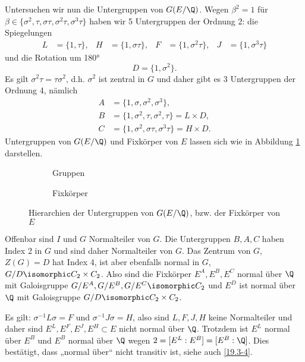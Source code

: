 \begin{ex}
	Untersuchen wir nun die Untergruppen von $G(E / \Q)$.
	Wegen $\beta^2 = 1$ für $\beta \in \{\sigma^2, \tau, \sigma\tau, \sigma^2\tau, \sigma^3\tau\}$ haben wir 5 Untergruppen der Ordnung 2:
	die Spiegelungen
	\begin{align*}
		L &= \{1, \tau\}, &
		H &= \{1, \sigma\tau\}, &
		F &= \{1, \sigma^2\tau\}, &
		J &= \{1, \sigma^3\tau\}
	\end{align*}
	und die Rotation um 180°
	\[
		D = \{1, \sigma^2\}.
	\]
	Es gilt $\sigma^2 \tau = \tau \sigma^2$, d.h. $\sigma^2$ ist zentral in $G$ und daher gibt es 3 Untergruppen der Ordnung 4, nämlich
	\begin{align*}
		A &= \{1, \sigma, \sigma^2, \sigma^3\}, \\
		B &= \{1, \sigma^2, \tau, \sigma^2, \tau\} = L \times D, \\
		C &= \{1, \sigma^2, \sigma\tau, \sigma^3 \tau\} = H \times D.
	\end{align*}
	Untergruppen von $G(E / \Q)$ und Fixkörper von $E$ lassen sich wie in Abbildung \ref{fig:19.5-5} darstellen.

	\begin{figure}[h]
		\centering
		\begin{subfigure}[b]{0.49\textwidth}
			\resizebox{\linewidth}{!}{}
			\caption{Gruppen}
		\end{subfigure}
		\hfill
		\begin{subfigure}[b]{0.49\textwidth}
			\resizebox{\linewidth}{!}{}
			\caption{Fixkörper}
		\end{subfigure}
		\caption{Hierarchien der Untergruppen von $G(E / \Q)$, bzw. der Fixkörper von $E$}
		 \label{fig:19.5-5}
	\end{figure}

	Offenbar sind $I$ und $G$ Normalteiler von $G$.
	Die Untergruppen $B, A, C$ haben Index 2 in $G$ und sind daher Normalteiler von $G$.
	Das Zentrum von $G$, $Z(G) = D$ hat Index 4, ist aber ebenfalls normal in $G$, $G / D \isomorphic C_2 \times C_2$.
	Also sind die Fixkörper $E^A, E^B, E^C$ normal über $\Q$ mit Galoisgruppe $G / E^A, G / E^B, G / E^C \isomorphic C_2$ und $E^D$ ist normal über $\Q$ mit Galoisgruppe $G / D \isomorphic C_2 \times C_2$.

	Es gilt: $\sigma^{-1} L \sigma = F$ und $\sigma^{-1} J \sigma = H$, also sind $L, F, J, H$ keine Normalteiler und daher sind $E^L, E^F, E^J, E^H \subset E$ nicht normal über $\Q$.
	Trotzdem ist $E^L$ normal über $E^B$ und $E^B$ normal über $\Q$ wegen $2 = [E^L : E^B] = [E^B : \Q]$.
	Dies bestätigt, dass „normal über“ nicht transitiv ist, siehe auch \ref{19.3-4}.
\end{ex}


